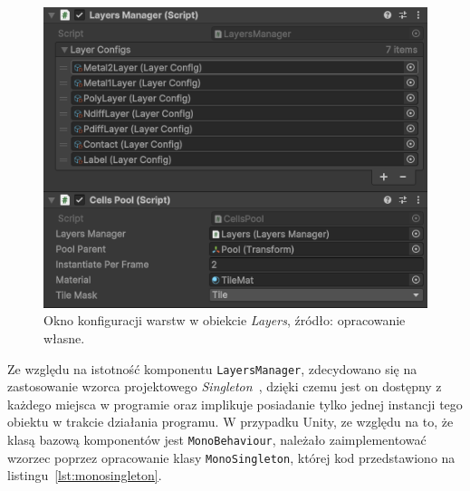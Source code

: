 \begin{figure}[h]
    \centering
    \includegraphics[width=.9\textwidth]{chapters/chapter4/rys/layers}
    \caption[Okno konfiguracji warstw w obiekcie \textit{Layers}.]
    {Okno konfiguracji warstw w obiekcie \textit{Layers}, źródło: opracowanie własne.}
    \label{fig:layers}
\end{figure}

Ze względu na istotność komponentu \texttt{LayersManager},
zdecydowano się na zastosowanie wzorca projektowego \textit{Singleton}~\cite{unity_csharp},
dzięki czemu jest on dostępny z każdego miejsca w programie
oraz implikuje posiadanie tylko jednej instancji tego obiektu w trakcie działania programu.
W przypadku Unity, ze względu na to, że klasą bazową komponentów jest \texttt{MonoBehaviour},
należało zaimplementować wzorzec poprzez opracowanie klasy \texttt{MonoSingleton},
której kod przedstawiono na listingu~\ref{lst:monosingleton}.


